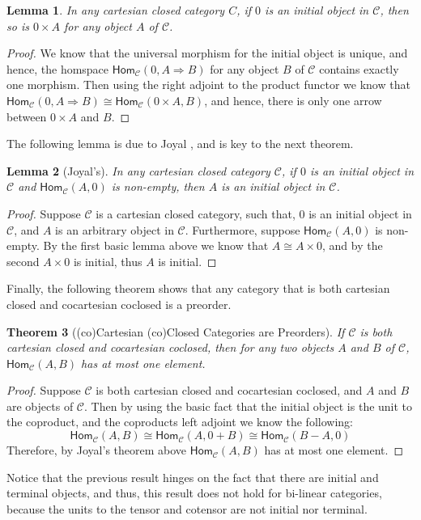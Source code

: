 \documentclass{lmcs}
\newtheorem{theorem}{Theorem}
\newtheorem{lemma}[theorem]{Lemma}
\newcommand{\cat}[1]{\mathcal{#1}}
\newcommand{\Hom}[3]{\mathsf{Hom}_{\cat{#1}}(#2,#3)}
\begin{document}
\begin{lemma}
  \label{lemma:products-of-initial-gives-initial}
  In any cartesian closed category $C$, if $0$ is an initial
  object in $\cat{C}$, then so is $0 \times A$ for any object $A$
  of $\cat{C}$.
\end{lemma}
\begin{proof}
    We know that the universal morphism for the initial object is
    unique, and hence, the homspace $\Hom{C}{0}{A \Rightarrow B}$ for
    any object $B$ of $\cat{C}$ contains exactly one morphism.  Then
    using the right adjoint to the product functor we know that
    $\Hom{C}{0}{A \Rightarrow B} \cong \Hom{C}{0 \times A}{B}$, and
    hence, there is only one arrow between $0 \times A$ and $B$.
\end{proof}
\noindent
The following lemma is due to Joyal \cite{?}, and is key to the next
theorem.
\begin{lemma}[Joyal's]
  \label{lemma:joyals}
  In any cartesian closed category $\cat{C}$, if $0$ is an initial
  object in $\cat{C}$ and $\Hom{C}{A}{0}$ is non-empty, then $A$ is an
  initial object in $\cat{C}$.
\end{lemma}
\begin{proof}
  Suppose $\cat{C}$ is a cartesian closed category, such that, $0$ is
  an initial object in $\cat{C}$, and $A$ is an arbitrary object in
  $\cat{C}$.  Furthermore, suppose $\Hom{C}{A}{0}$ is non-empty.  By
  the first basic lemma above we know that $A \cong A \times 0$, and
  by the second $A \times 0$ is initial, thus $A$ is initial.
\end{proof}
Finally, the following theorem shows that any category that is both
cartesian closed and cocartesian coclosed is a preorder.
\begin{theorem}[(co)Cartesian (co)Closed Categories are Preorders]
  \label{thm:dengerate-to-preorder}
  If $\cat{C}$ is both cartesian closed and cocartesian coclosed, then
  for any two objects $A$ and $B$ of $\cat{C}$, $\Hom{C}{A}{B}$ has at
  most one element.
\end{theorem}
\begin{proof}
  Suppose $\cat{C}$ is both cartesian closed and cocartesian coclosed,
  and $A$ and $B$ are objects of $\cat{C}$.  Then by using the basic
  fact that the initial object is the unit to the coproduct, and the
  coproducts left adjoint we know the following:
  \[\Hom{C}{A}{B} \cong \Hom{C}{A}{0 + B} \cong \Hom{C}{B - A}{0}\]
  Therefore, by Joyal's theorem above $\Hom{C}{A}{B}$ has at most one
  element.
\end{proof}
\noindent
Notice that the previous result hinges on the fact that there are
initial and terminal objects, and thus, this result does not hold for
bi-linear categories, because the units to the tensor and cotensor are
not initial nor terminal.
\end{document}
